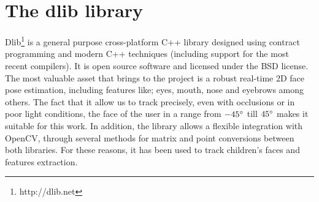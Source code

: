 \section{The dlib library}
Dlib\footnote{http://dlib.net} is a general purpose cross-platform C++ library designed using contract programming and modern C++ techniques (including support for the most recent compilers). It is open source software and licensed under the BSD license. The most valuable asset that brings to the project is a robust real-time 2D face pose estimation, including features like; eyes, mouth, nose and eyebrows among others. The fact that it allow us to track precisely, even with occlusions or in poor light conditions, the face of the user in a range from $ -45\degree $  till $ 45\degree $ makes it suitable for this work. In addition, the library allows a flexible integration with OpenCV, through several methods for matrix and point conversions between both libraries. For these reasons, it has been used to track children's faces and features extraction.